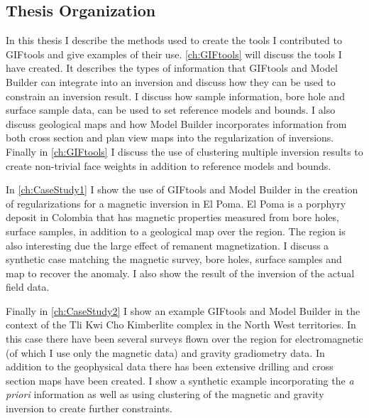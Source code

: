 \begin{itemize}
\begin{itemize}
\section{Thesis Organization}
\label{sec:Thesis Organization}
		
In this thesis I describe the methods used to create the tools I contributed to GIFtools and give examples of their use. \autoref{ch:GIFtools} will discuss the tools I have created. It  describes the types of information that GIFtools and Model Builder can integrate into an inversion and discuss how they can be used to constrain an inversion result. I discuss how sample information, bore hole and surface sample data, can be used to set reference models and bounds. I also discuss geological maps and how Model Builder incorporates information from both cross section and plan view maps into the regularization of inversions. Finally in \autoref{ch:GIFtools}  I discuss the use of clustering multiple inversion results to create non-trivial face weights in addition to reference models and bounds.

In \autoref{ch:CaseStudy1} I show the use of GIFtools and Model Builder in the creation of regularizations for a magnetic inversion in El Poma. El Poma is a porphyry deposit in Colombia that has magnetic properties measured from bore holes, surface samples, in addition to a geological map over the region. The region is also interesting due the large effect of remanent magnetization. I discuss a synthetic case matching the magnetic survey, bore holes, surface samples and map to recover the anomaly. I also show the result of the inversion of the actual field data.

Finally in \autoref{ch:CaseStudy2} I show an example GIFtools and Model Builder in the context of the Tli Kwi Cho Kimberlite complex in the North West territories. In this case there have been several surveys flown over the region for electromagnetic (of which I use only the magnetic data) and gravity gradiometry data. In addition to the geophysical data there has been extensive drilling and cross section maps have been created. I show a synthetic example incorporating the \emph{a priori} information as well as using clustering of the magnetic and gravity inversion to create further constraints.


\end{itemize}
\end{itemize}





\endinput

 Interestingly, the assumption that all magnetizations are in the same direction also assumes that all Koenigsberger ratios are equal.

Any text after an \endinput is ignored.
You could put scraps here or things in progress.
